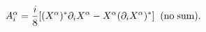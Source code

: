 \begin{equation}
\label{currentform}
A^{\alpha}_i=\frac{i}{8}[(X^{\alpha})^*\partial_iX^{\alpha}- 
X^{\alpha}(\partial_iX^{\alpha})^*]\;\;{\rm (no\;sum)}.
\end{equation}

